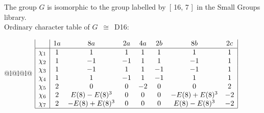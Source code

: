 \documentclass[varwidth=\maxdimen,border=10]{standalone}
\begin{document}
The group $G$ is isomorphic to the group labelled by\ [ 16, 7 ]\ in the Small Groups library.\\
Ordinary character table of $G$\ $\cong$\ D16:\\
\begin{center}
\begin{tabular}{@{}l@{}l@{}l@{}}
\hline
\(\begin{array}{|l|ccccccc|}
  & 1a & 8a & 2a & 4a & 2b & 8b & 2c\\ \hline
\chi_{1} & 1 & 1 & 1 & 1 & 1 & 1 & 1\\
\chi_{2} & 1 & -1 & -1 & 1 & 1 & -1 & 1\\
\chi_{3} & 1 & -1 & 1 & 1 & -1 & -1 & 1\\
\chi_{4} & 1 & 1 & -1 & 1 & -1 & 1 & 1\\
\chi_{5} & 2 & 0 & 0 & -2 & 0 & 0 & 2\\
\chi_{6} & 2 & E(8)-E(8)^{3} & 0 & 0 & 0 & -E(8)+E(8)^{3} & -2\\
\chi_{7} & 2 & -E(8)+E(8)^{3} & 0 & 0 & 0 & E(8)-E(8)^{3} & -2\\
\hline
\end{array}\)\\
\end{tabular}
\end{center}
\end{document}
